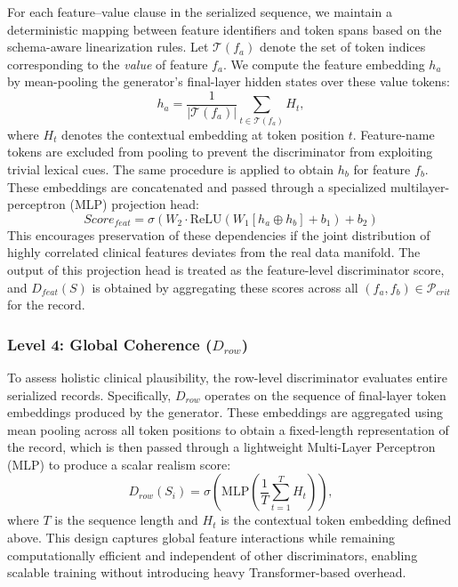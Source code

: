 For each feature--value clause in the serialized sequence, we maintain a deterministic mapping between feature identifiers and token spans based on the schema-aware linearization rules. Let $\mathcal{T}(f_a)$ denote the set of token indices corresponding to the \emph{value} of feature $f_a$. We compute the feature embedding $h_a$ by mean-pooling the generator's final-layer hidden states over these value tokens:
\begin{equation}
h_a = \frac{1}{|\mathcal{T}(f_a)|} \sum_{t \in \mathcal{T}(f_a)} H_t,
\end{equation}
where $H_t$ denotes the contextual embedding at token position $t$. Feature-name tokens are excluded from pooling to prevent the discriminator from exploiting trivial lexical cues. The same procedure is applied to obtain $h_b$ for feature $f_b$.
These embeddings are concatenated and passed through a specialized multilayer-perceptron (MLP) projection head:
\begin{equation}
    Score_{feat} = \sigma(W_2 \cdot \text{ReLU}(W_1 [h_a \oplus h_b] + b_1) + b_2)
\end{equation}
This encourages preservation of these dependencies if the joint distribution of highly correlated clinical features deviates from the real data manifold.
The output of this projection head is treated as the feature-level discriminator score, and $D_{feat}(S)$ is obtained by aggregating these scores across all $(f_a,f_b)\in\mathcal{P}_{crit}$ for the record.


\subsubsection{Level 4: Global Coherence ($D_{row}$)}
To assess holistic clinical plausibility, the row-level discriminator evaluates entire serialized records. Specifically, $D_{row}$ operates on the sequence of final-layer token embeddings produced by the generator. These embeddings are aggregated using mean pooling across all token positions to obtain a fixed-length representation of the record, which is then passed through a lightweight Multi-Layer Perceptron (MLP) to produce a scalar realism score:
\begin{equation}
D_{row}(S_i) = \sigma\!\left(\text{MLP}\!\left(\frac{1}{T}\sum_{t=1}^{T} H_t\right)\right),
\end{equation}
where $T$ is the sequence length and $H_t$ is the contextual token embedding defined above. This design captures global feature interactions while remaining computationally efficient and independent of other discriminators, enabling scalable training without introducing heavy Transformer-based overhead.

